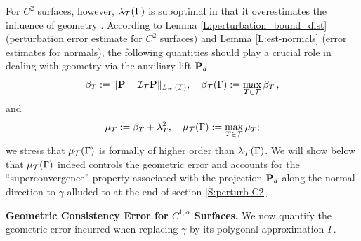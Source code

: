 For $C^2$ surfaces, however, $\lambda_{\mathcal{T}}(\Gamma)$ is suboptimal in that it
overestimates the influence of geometry \cite{BD:18}. According to Lemma
\ref{L:perturbation_bound_dist} (perturbation error estimate for $C^2$ surfaces)
and Lemma
\ref{L:est-normals} (error estimates for normals), the following quantities
should play a crucial role in dealing with geometry via the auxiliary lift ${\bf P}_d$
%
\begin{equation}
\label{d:beta}
\beta_T:=\|{\bf P}-\mathcal{I}_{\mathcal{T}}{\bf P}\|_{L_\infty(T)},
\quad\beta_{\mathcal{T}}(\Gamma):=\max_{T \in \mathcal{T}} \beta_T \, ,
\end{equation}
%
and
%
\begin{equation}\label{d:mu}
\mu_T := \beta_T + \lambda_T^2, \quad \mu_{\mathcal{T}}(\Gamma) := 
\max_{T \in \mathcal{T}} \mu_T;
\end{equation}
we stress that $\mu_{\mathcal{T}}(\Gamma)$ is formally of higher order than $\lambda_{\mathcal{T}}(\Gamma)$. 
We will show below that $\mu_{\mathcal{T}}(\Gamma)$ indeed controls the geometric error and
accounts for the ``superconvergence'' property associated with
the projection ${\bf P}_d$ along the normal direction to $\gamma$
alluded to at the end of section \ref{S:perturb-C2}.




\medskip\noindent
{\bf Geometric Consistency Error for $C^{1,\alpha}$ Surfaces.}  %
%
We now quantify the geometric error incurred when replacing $\gamma$ by its polygonal approximation $\Gamma$.

